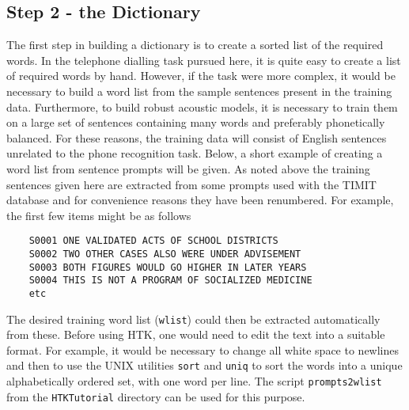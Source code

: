 \subsection{Step 2 - the Dictionary}

The first step in building a dictionary is to create a sorted list of the
required words. 
In the telephone dialling task pursued here, it is quite easy to create a list
of required words by hand. However, if the task were more complex, it would be
necessary to build a word list from the sample sentences present in the training
data. Furthermore, to build robust acoustic models, it is necessary to train
them on a large set of sentences containing many words and preferably
phonetically balanced. For these reasons, the training data will consist of
English sentences unrelated to the phone recognition task. Below, a short
example of creating a word list from sentence prompts will be given. As noted
above the training sentences given here are extracted from some prompts used
with the TIMIT database and for convenience reasons they 
have been renumbered. For example, the first few items might be as follows
\vspace{1cm}
\begin{verbatim}
    S0001 ONE VALIDATED ACTS OF SCHOOL DISTRICTS
    S0002 TWO OTHER CASES ALSO WERE UNDER ADVISEMENT
    S0003 BOTH FIGURES WOULD GO HIGHER IN LATER YEARS
    S0004 THIS IS NOT A PROGRAM OF SOCIALIZED MEDICINE
    etc
\end{verbatim}
The desired training word list (\texttt{wlist}) could then be
extracted automatically from these.  Before using HTK, one would need to edit
the text into a suitable format.  For example, it would be necessary to change
all white space to newlines and then to use the UNIX utilities \texttt{sort}
and \texttt{uniq} to sort the words into a unique alphabetically ordered set,
with one word per line.  The script \texttt{prompts2wlist} from the
\texttt{HTKTutorial} directory can be used for this purpose.

